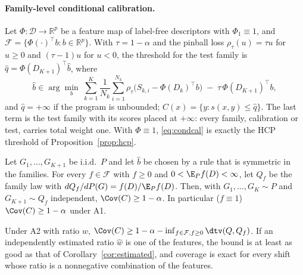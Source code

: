 
\paragraph{Family-level conditional calibration.}
Let $\Phi:\mathcal{D}\to\mathbb{R}^p$ be a feature map of label-free descriptors with $\Phi_1\equiv1$, and $\mathcal{F}=\{\Phi(\cdot)^\top b: b\in\mathbb{R}^p\}$. With $\tau=1-\alpha$ and the pinball loss $\rho_\tau(u)=\tau u$ for $u\ge0$ and $(\tau-1)u$ for $u<0$, the threshold for the test family is $\hat q=\Phi(D_{K+1})^\top\hat b$, where
\begin{equation}\label{eq:condcal}
\hat b\in\arg\min_{b}\ \sum_{k=1}^{K}\frac{1}{N_k}\sum_{i=1}^{N_k}\rho_\tau\big(S_{k,i}-\Phi(D_k)^\top b\big)\;-\;\tau\,\Phi(D_{K+1})^\top b,
\end{equation}
and $\hat q=+\infty$ if the program is unbounded; $C(x)=\{y:s(x,y)\le\hat q\}$. The last term is the test family with its scores placed at $+\infty$: every family, calibration or test, carries total weight one. With $\Phi\equiv1$, \eqref{eq:condcal} is exactly the HCP threshold of Proposition~\ref{prop:hcp}.

\begin{theorem}\label{thm:conditional}
Let $G_1,\dots,G_{K+1}$ be i.i.d.\ $P$ and let $\hat b$ be chosen by a rule that is symmetric in the families. For every $f\in\mathcal{F}$ with $f\ge0$ and $0<\E_Pf(D)<\infty$, let $Q_f$ be the family law with $dQ_f/dP(G)=f(D)/\E_Pf(D)$. Then, with $G_1,\dots,G_K\sim P$ and $G_{K+1}\sim Q_f$ independent, $\Cov(C)\ge1-\alpha$. In particular ($f\equiv1$) $\Cov(C)\ge1-\alpha$ under A1.
\end{theorem}

\begin{corollary}\label{cor:conditional}
Under A2 with ratio $w$, $\Cov(C)\ge1-\alpha-\inf_{f\in\mathcal{F},f\ge0}\dtv(Q,Q_f)$. If an independently estimated ratio $\hat w$ is one of the features, the bound is at least as good as that of Corollary~\ref{cor:estimated}, and coverage is exact for every shift whose ratio is a nonnegative combination of the features.
\end{corollary}

